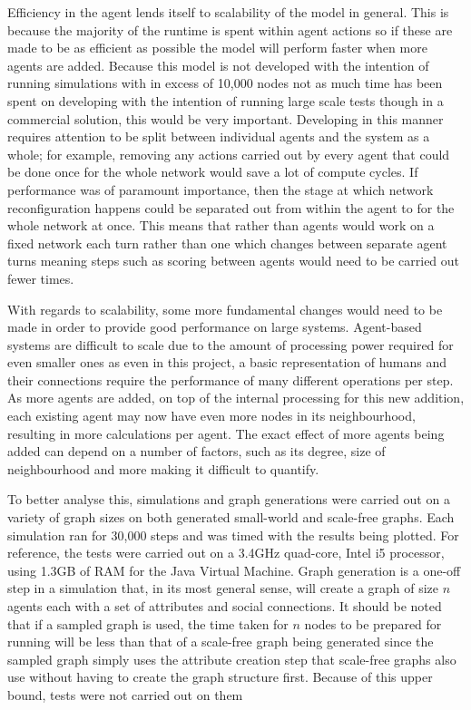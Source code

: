 \documentclass[]{report}
\begin{document}
Efficiency in the agent lends itself to scalability of the model in general. This is because the majority of the runtime is spent within agent actions so if these are made to be as efficient as possible the model will perform faster when more agents are added. Because this model is not developed with the intention of running simulations with in excess of 10,000 nodes not as much time has been spent on developing with the intention of running large scale tests though in a commercial solution, this would be very important. Developing in this manner requires attention to be split between individual agents and the system as a whole; for example, removing any actions carried out by every agent that could be done once for the whole network would save a lot of compute cycles. If performance was of paramount importance, then the stage at which network reconfiguration happens could be separated out from within the agent to for the whole network at once. This means that rather than agents would work on a fixed network each turn rather than one which changes between separate agent turns meaning steps such as scoring between agents would need to be carried out fewer times.

With regards to scalability, some more fundamental changes would need to be made in order to provide good performance on large systems. Agent-based systems are difficult to scale due to the amount of processing power required for even smaller ones as even in this project, a basic representation of humans and their connections require the performance of many different operations per step. As more agents are added, on top of the internal processing for this new addition, each existing agent may now have even more nodes in its neighbourhood, resulting in more calculations per agent. The exact effect of more agents being added can depend on a number of factors, such as its degree, size of neighbourhood and more making it difficult to quantify.

To better analyse this, simulations and graph generations were carried out on a variety of graph sizes on both generated small-world and scale-free graphs. Each simulation ran for 30,000 steps and was timed with the results being plotted. For reference, the tests were carried out on a 3.4GHz quad-core, Intel i5 processor, using 1.3GB of RAM for the Java Virtual Machine. Graph generation is a one-off step in a simulation that, in its most general sense, will create a graph of size $n$ agents each with a set of attributes and social connections. It should be noted that if a sampled graph is used, the time taken for $n$ nodes to be prepared for running will be less than that of a scale-free graph being generated since the sampled graph simply uses the attribute creation step that scale-free graphs also use without having to create the graph structure first. Because of this upper bound, tests were not carried out on them
\end{document}
